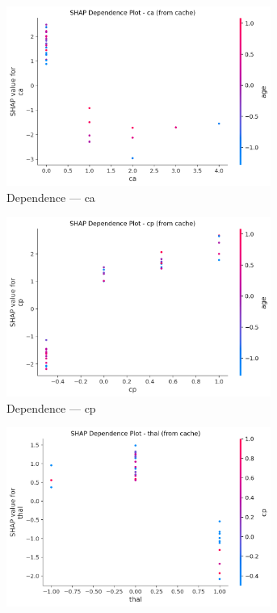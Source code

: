 \begin{figure}[H]
\centering
\begin{subfigure}[b]{0.31\textwidth}\centering
\includegraphics[width=0.95\textwidth]{Result/heart_dataset/LightGBM/SHAP/Dependence CA.png}
\caption{Dependence — ca}\label{fig:lgbm_heart_dep_ca}
\end{subfigure}\hfill
\begin{subfigure}[b]{0.31\textwidth}\centering
\includegraphics[width=0.95\textwidth]{Result/heart_dataset/LightGBM/SHAP/Dependence CP.png}
\caption{Dependence — cp}\label{fig:lgbm_heart_dep_cp}
\end{subfigure}\hfill
\begin{subfigure}[b]{0.31\textwidth}\centering
\includegraphics[width=0.95\textwidth]{Result/heart_dataset/LightGBM/SHAP/Dependence thal.png}

\end{subfigure}
\end{figure}
